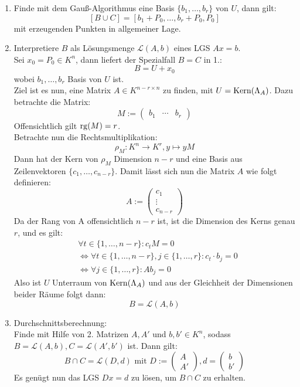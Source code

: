 \documentclass[parskip,a4paper,twoside,DIV15,BCOR12mm]{scrbook}
\begin{document}
\begin{enumerate}
\item Finde mit dem Gauß-Algorithmus eine Basis $\{b_1,\ldots,b_r\}$ von $U$, dann gilt:
\[[B\cup C]=[b_1+P_0,\ldots,b_r+P_0,P_0]\]
mit erzeugenden Punkten in allgemeiner Lage.
\item Interpretiere $B$ als Lösungsmenge $\mathcal{L}(A,b)$ eines LGS $Ax=b$.\\
Sei $x_0=P_0\in K^n$, dann liefert der Spezialfall $B=C$ in 1.:
\[B=U+x_0\]
wobei ${b_1,\ldots,b_r}$ Basis von $U$ ist.\\
Ziel ist es nun, eine Matrix $A\in K^{n-r\times n}$ zu finden, mit $U=\operatorname{Kern}(\Lambda_A)$.
Dazu betrachte die Matrix:
\[M:=
\begin{pmatrix}
b_1&\cdots&b_r
\end{pmatrix}\]
Offensichtlich gilt $\operatorname{rg}(M)=r$.\\
Betrachte nun die Rechtsmultiplikation:
\[\rho_M:K^n\to K^r,y\mapsto yM\]
Dann hat der Kern von $\rho_M$ Dimension $n-r$ und eine Basis aus Zeilenvektoren
$\{c_1,\ldots,c_{n-r}\}$. Damit lässt sich nun die Matrix $A$ wie folgt definieren:
\[A:=
\begin{pmatrix}
c_1\\
\vdots\\
c_{n-r}
\end{pmatrix}\]
Da der Rang von A offensichtlich $n-r$ ist, ist die Dimension des Kerns genau $r$, und es gilt:
\begin{align*}
&\forall t\in\{1,\ldots,n-r\}: c_tM=0\\
&\iff\forall t\in\{1,\ldots,n-r\},j\in\{1,\ldots,r\}: c_t\cdot b_j=0\\
&\iff\forall j\in\{1,\ldots,r\}: Ab_j=0
\end{align*}
Also ist $U$ Unterraum von $\operatorname{Kern}(\Lambda_A)$ und aus der Gleichheit der Dimensionen
beider Räume folgt dann:
\[B=\mathcal{L}(A,b)\]
\item Durchschnittsberechnung:\\
Finde mit Hilfe von 2. Matrizen $A,A'$ und $b,b'\in K^n$, sodass $B=\mathcal{L}(A,b),
C=\mathcal{L}(A',b')$ ist. Dann gilt:
\[B\cap C = \mathcal{L}(D,d)\text{ mit }D:=
\begin{pmatrix}
A\\
A'
\end{pmatrix}, d=
\begin{pmatrix}
b\\
b'
\end{pmatrix}\]
Es genügt nun das LGS $Dx=d$ zu lösen, um $B\cap C$ zu erhalten. 
\end{enumerate}
\end{document}
